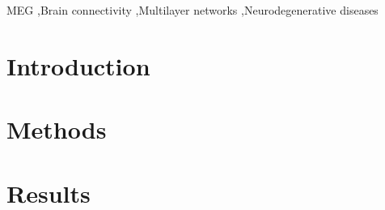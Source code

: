 \documentclass[1p]{elsarticle}
\begin{document}
\begin{frontmatter}

	\begin{abstract}
		
	\end{abstract}

	\begin{keyword}
		MEG \sep Brain connectivity \sep Multilayer networks \sep Neurodegenerative diseases
	\end{keyword}

\end{frontmatter}


\newpage



\section{Introduction} \label{sec:introduction}





\section{Methods} \label{sec:methods}





\section{Results} \label{sec:results}




\end{document}
